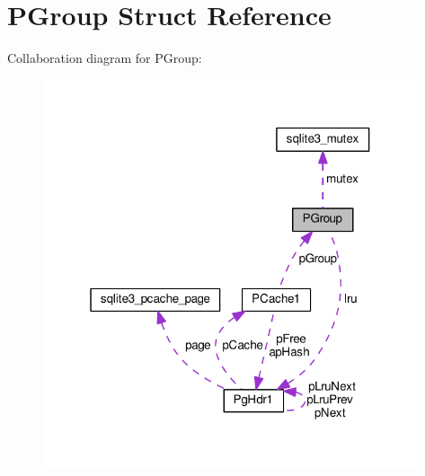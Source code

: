 \hypertarget{structPGroup}{}\section{P\+Group Struct Reference}
\label{structPGroup}


Collaboration diagram for P\+Group\+:\nopagebreak
\begin{figure}[H]
\begin{center}
\leavevmode
\includegraphics[width=313pt]{structPGroup__coll__graph}
\end{center}
\end{figure}
